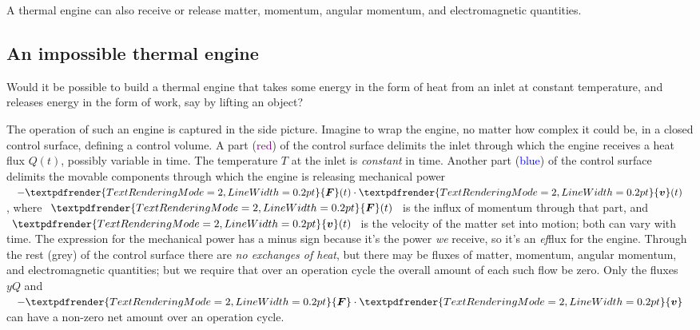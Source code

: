 \documentclass[a4paper,12pt,%
onecolumn,oneside,%
british%
]{memoir}
\renewcommand*{\bm}[1]{\textpdfrender{TextRenderingMode=2,LineWidth=0.2pt}{\boldsymbol{#1}}}
\renewcommand*{\|}[1][]{\nonscript\:#1\vert\nonscript\:\mathopen{}}
\newcommand*{\yv}{\bm{v}}
\newcommand*{\yQ}{Q}%
\newcommand*{\yF}{\bm{F}}
\newcommand*{\yT}{T}%
\begin{document}
A thermal engine can also receive or release matter, momentum, angular momentum, and electromagnetic quantities.

\subsection{An impossible thermal engine}
\label{sec:heat_engine1}

Would it be possible to build a thermal engine that takes some energy in the form of heat  from an inlet at constant temperature, and releases energy in the form of work, say by lifting an object?

%
%
The operation of such an engine is captured in the side picture. Imagine to wrap the engine, no matter how complex it could be, in a closed control surface, defining a control volume. A part (\textcolor{purple}{red}) of the control surface delimits the inlet through which the engine receives a heat flux $\yQ(t)$, possibly variable in time. The temperature $\yT$ at the inlet is \emph{constant} in time. Another part (\textcolor{blue}{blue}) of the control surface delimits the movable components through which the engine is releasing mechanical power $-\yF(t)\cdot\yv(t)$, where $\yF(t)$ is the influx of momentum through that part, and $\yv(t)$ is the velocity of the matter set into motion; both can vary with time. The expression for the mechanical power has a minus sign because it's the power \emph{we} receive, so it's an \emph{ef}flux for the engine. Through the rest (\textcolor{midgrey}{grey}) of the control surface there are \emph{no exchanges of heat}, but there may be fluxes of matter, momentum, angular momentum, and electromagnetic quantities; but we require that over an operation cycle the overall amount of each such flow be zero. Only the fluxes $yQ$ and $-\yF\cdot\yv$ can have a non-zero net amount over an operation cycle.
\end{document}
